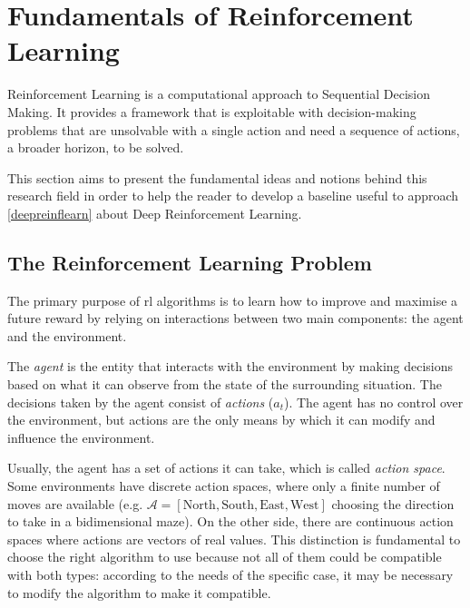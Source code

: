 \section{Fundamentals of Reinforcement Learning} \label{fundreinflearn}


Reinforcement Learning is a computational approach to Sequential Decision Making. It provides a framework that is exploitable with decision-making problems that are unsolvable with a single action and need a sequence of actions, a broader horizon, to be solved. 

This section aims to present the fundamental ideas and notions behind this research field in order to help the reader to develop a baseline useful to approach \vref{deepreinflearn} about Deep Reinforcement Learning.

\subsection{The Reinforcement Learning Problem}

The primary purpose of \acrshort{rl} algorithms is to learn how to improve and maximise a future reward by relying on interactions between two main components: the agent and the environment. 

The \textit{agent} is the entity that interacts with the environment by making decisions based on what it can observe from the state of the surrounding situation. The decisions taken by the agent consist of \textit{actions} ($a_t$).  The agent has no control over the environment, but actions are the only means by which it can modify and influence the environment.

Usually, the agent has a set of actions it can take, which is called \textit{action space}.
Some environments have discrete action spaces, where only a finite number of moves are available (e.g. $\mathcal{A} = [\text{North}, \text{South}, \text{East}, \text{West}]$ choosing the direction to take in a bidimensional maze). On the other side, there are continuous action spaces where actions are vectors of real values.
This distinction is fundamental to choose the right algorithm to use because not all of them could be compatible with both types: according to the needs of the specific case, it may be necessary to modify the algorithm to make it compatible.

